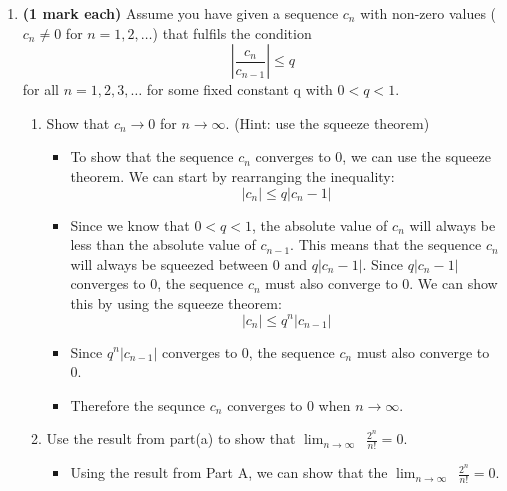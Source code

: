 \documentclass[12pt]{report}
\begin{document}
\begin{enumerate}[leftmargin=\labelsep]
    \item {\bf (1 mark each)} Assume you have given a sequence $c_n$ with non-zero values ($c_n\neq0$ for $n=1,2,\dots$) that fulfils the condition
        \begin{equation}
            \left|\frac{c_n}{c_{n-1}}\right|\leq q
        \end{equation} for all $n=1,2,3,\dots$ for some fixed constant q with $0<q<1$.
        \begin{enumerate}
            \item Show that $c_n\to0$ for $n\to \infty$. (Hint: use the squeeze theorem)
                \begin{tcolorbox}
                    \begin{itemize}[label={}]
                        \item To show that the sequence $c_n$ converges to 0, we can use the squeeze theorem. We can start by rearranging the inequality:
                        \begin{equation*}
                            |c_n| \leq q|c_n-1|
                        \end{equation*}
                        \item Since we know that $0<q<1$, the absolute value of $c_n$ will always be less than the absolute value of $c_{n-1}$. This means that the sequence $c_n$ will always be squeezed between 0 and $q|c_n-1|$. Since $q|c_n-1|$ converges to 0, the sequence $c_n$ must also converge to 0. We can show this by using the squeeze theorem:
                        \begin{equation*}
                            |c_n| \leq q^n|c_{n-1}|
                        \end{equation*}
                        \item Since $q^n|c_{n-1}|$ converges to 0, the sequence $c_n$ must also converge to 0.
                        \item Therefore the sequnce $c_n$ converges to 0 when $n\to \infty$.
                    \end{itemize}
                \end{tcolorbox}
\newpage
            \item Use the result from part(a) to show that $\displaystyle{\lim_{n \to \infty}}\,\,\, \frac{2^n}{n!}=0$.
                \begin{tcolorbox}
                    \begin{itemize}[label={}]
                        \item Using the result from Part A, we can show that the $\displaystyle{\lim_{n \to \infty}}\,\,\, \frac{2^n}{n!}=0$.

\end{itemize}
\end{tcolorbox}
\end{enumerate}
\end{enumerate}
\end{document}
